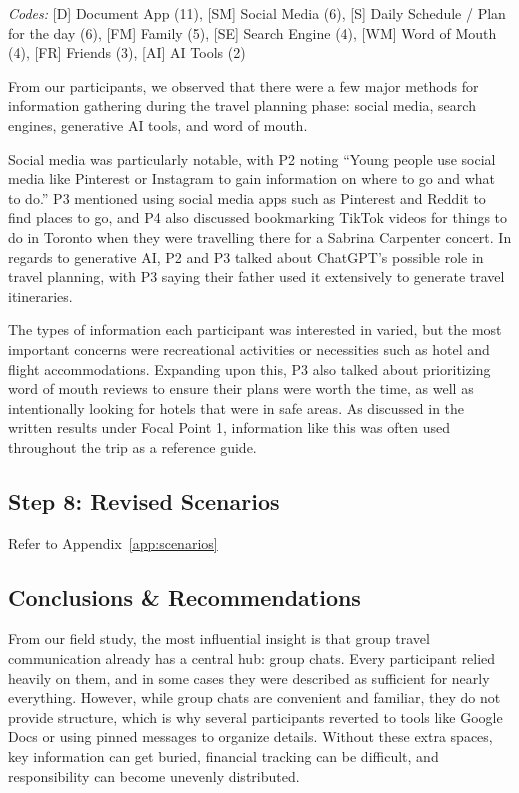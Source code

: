 \documentclass[12pt,a4paper]{article}
\begin{document}
\textit{Codes:} [D] Document App (11), [SM] Social Media (6), [S] Daily Schedule / Plan for the day (6), [FM] Family (5), [SE] Search Engine (4), [WM] Word of Mouth (4), [FR] Friends (3), [AI] AI Tools (2)

\vspace{6pt}

From our participants, we observed that there were a few major methods for information gathering during the travel planning phase: social media, search engines, generative AI tools, and word of mouth.

\vspace{6pt}

Social media was particularly notable, with P2 noting “Young people use social media like Pinterest or Instagram to gain information on where to go and what to do.” P3 mentioned using social media apps such as Pinterest and Reddit to find places to go, and P4 also discussed bookmarking TikTok videos for things to do in Toronto when they were travelling there for a Sabrina Carpenter concert. In regards to generative AI, P2 and P3 talked about ChatGPT’s possible role in travel planning, with P3 saying their father used it extensively to generate travel itineraries.

\vspace{6pt}

The types of information each participant was interested in varied, but the most important concerns were recreational activities or necessities such as hotel and flight accommodations. Expanding upon this, P3 also talked about prioritizing word of mouth reviews to ensure their plans were worth the time, as well as intentionally looking for hotels that were in safe areas. As discussed in the written results under Focal Point 1, information like this was often used throughout the trip as a reference guide.

\subsection{Step 8: Revised Scenarios}
Refer to Appendix~\ref{app:scenarios}
\subsection{Conclusions \& Recommendations}

From our field study, the most influential insight is that group travel communication already has a central hub: group chats. Every participant relied heavily on them, and in some cases they were described as sufficient for nearly everything. However, while group chats are convenient and familiar, they do not provide structure, which is why several participants reverted to tools like Google Docs or using pinned messages to organize details. Without these extra spaces, key information can get buried, financial tracking can be difficult, and responsibility can become unevenly distributed. 
\\
\end{document}
